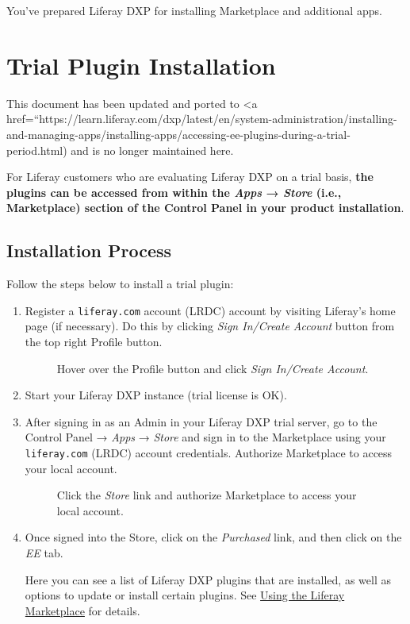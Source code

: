 You've prepared Liferay DXP for installing Marketplace and additional
apps.

\chapter{Trial Plugin Installation}\label{trial-plugin-installation}

{This document has been updated and ported to \textless a
href=``https://learn.liferay.com/dxp/latest/en/system-administration/installing-and-managing-apps/installing-apps/accessing-ee-plugins-during-a-trial-period.html)
and is no longer maintained here.}

For Liferay customers who are evaluating Liferay DXP on a trial basis,
\textbf{the plugins can be accessed from within the \emph{Apps} →
\emph{Store} (i.e., Marketplace) section of the Control Panel in your
product installation}.

\section{Installation Process}\label{installation-process}

Follow the steps below to install a trial plugin:

\begin{enumerate}
\def\labelenumi{\arabic{enumi}.}
\item
  Register a \texttt{liferay.com} account (LRDC) account by visiting
  Liferay's home page (if necessary). Do this by clicking \emph{Sign
  In/Create Account} button from the top right Profile button.

  \begin{figure}
  \centering
  \caption{Hover over the Profile button and click \emph{Sign In/Create
  Account}.}
  \end{figure}
\item
  Start your Liferay DXP instance (trial license is OK).
\item
  After signing in as an Admin in your Liferay DXP trial server, go to
  the Control Panel → \emph{Apps} → \emph{Store} and sign in to the
  Marketplace using your \texttt{liferay.com} (LRDC) account
  credentials. Authorize Marketplace to access your local account.

  \begin{figure}
  \centering
  \caption{Click the \emph{Store} link and authorize Marketplace to
  access your local account.}
  \end{figure}
\item
  Once signed into the Store, click on the \emph{Purchased} link, and
  then click on the \emph{EE} tab.

  Here you can see a list of Liferay DXP plugins that are installed, as
  well as options to update or install certain plugins. See
  \href{/docs/7-2/user/-/knowledge_base/u/using-the-liferay-marketplace}{Using
  the Liferay Marketplace} for details.
\end{enumerate}

